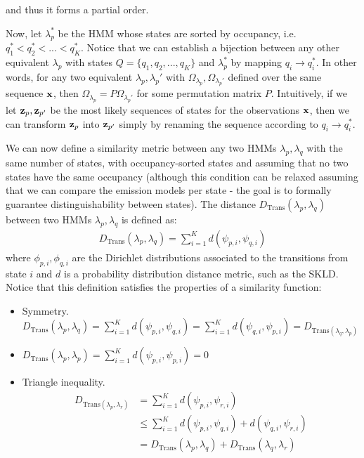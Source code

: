 \documentclass[../main.tex]{subfiles}
\begin{document}
and thus it forms a partial order.
\par Now, let $\lambda_p^\text{*}$ be the HMM whose states are sorted by occupancy, i.e. $q_1^\text{*} < q_2^\text{*} < ... < q_K^\text{*}$. Notice that we can establish a bijection between any other equivalent $\lambda_p$ with states $Q = \{q_1, q_2, ..., q_K\}$ and $\lambda_p^\text{*}$ by mapping $q_i \rightarrow q_i^\text{*}$. In other words, for any two equivalent $\lambda_p, \lambda_p'$ with $\Omega_{\lambda_p}, \Omega_{\lambda_p'}$ defined over the same sequence $\mathbf{x}$, then $\Omega_{\lambda_p} = P\Omega_{\lambda_p'}$ for some permutation matrix $P$. Intuitively, if we let $\mathbf{z}_p, \mathbf{z}_{p'}$ be the most likely sequences of states for the observations $\mathbf{x}$, then we can transform $\mathbf{z}_p$ into $\mathbf{z}_{p'}$ simply by renaming the sequence according to $q_i \rightarrow q_i^\text{*}$. 
\par We can now define a similarity metric between any two HMMs $\lambda_p, \lambda_q$ with the same number of states, with occupancy-sorted states and assuming that no two states have the same occupancy (although this condition can be relaxed assuming that we can compare the emission models per state - the goal is to formally guarantee distinguishability between states). The distance $D_{\text{Trans}}(\lambda_p, \lambda_q)$ between two HMMs $\lambda_p, \lambda_q$ is defined as:
\begin{align*}
D_{\text{Trans}}(\lambda_p, \lambda_q) = \sum_{i=1}^K d(\psi_{p, i}, \psi_{q, i})
\end{align*}
where $\phi_{p, i}, \phi_{q, i}$ are the Dirichlet distributions associated to the transitions from state $i$ and $d$ is a probability distribution distance metric, such as the SKLD. Notice that this definition satisfies the properties of a similarity function:
\begin{itemize}
\item Symmetry. $D_{\text{Trans}}(\lambda_p, \lambda_q) = \sum_{i=1}^K d(\psi_{p, i}, \psi_{q, i}) = \sum_{i=1}^K d(\psi_{q, i}, \psi_{p, i}) = D_{\text{Trans}(\lambda_q, \lambda_p)}$
\item $D_{\text{Trans}}(\lambda_p, \lambda_p) = \sum_{i=1}^K d(\psi_{p, i}, \psi_{p, i}) = 0$
\item Triangle inequality. 
\begin{align*}
D_{\text{Trans}(\lambda_p, \lambda_r)} &= \sum_{i=1}^K d(\psi_{p, i}, \psi_{r, i}) \\
&\leq \sum_{i=1}^K d(\psi_{p, i}, \psi_{q, i}) + d(\psi_{q, i}, \psi_{r, i})\\
&= D_{\text{Trans}}(\lambda_p, \lambda_q) + D_{\text{Trans}}(\lambda_q, \lambda_r)
\end{align*}
\end{itemize}
\end{document}
